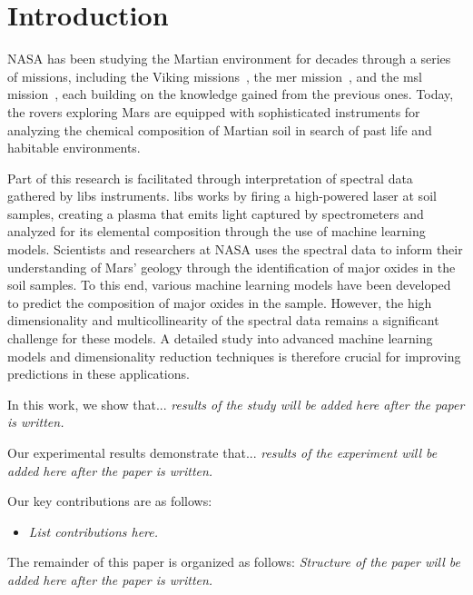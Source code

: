 \section{Introduction}\label{sec:introduction}

NASA has been studying the Martian environment for decades through a series of missions, including the Viking missions~\cite{marsnasagov_vikings}, the \gls{mer} mission~\cite{marsnasagov_observer, marsnasagov_spirit_opportunity}, and the \gls{msl} mission~\cite{marsnasagov_msl}, each building on the knowledge gained from the previous ones.
Today, the rovers exploring Mars are equipped with sophisticated instruments for analyzing the chemical composition of Martian soil in search of past life and habitable environments.

Part of this research is facilitated through interpretation of spectral data gathered  by \gls{libs} instruments.
\gls{libs} works by firing a high-powered laser at soil samples, creating a plasma that emits light captured by spectrometers and analyzed for its elemental composition through the use of machine learning models.
Scientists and researchers at NASA uses the spectral data to inform their understanding of Mars' geology through the identification of major oxides in the soil samples.
To this end, various machine learning models have been developed to predict the composition of major oxides in the sample.
However, the high dimensionality and multicollinearity of the spectral data remains a significant challenge for these models.
A detailed study into advanced machine learning models and dimensionality reduction techniques is therefore crucial for improving predictions in these applications.


In this work, we show that... \textit{results of the study will be added here after the paper is written.}

Our experimental results demonstrate that... \textit{results of the experiment will be added here after the paper is written.}

Our key contributions are as follows:
\begin{itemize}
	\item \textit{List contributions here.}
\end{itemize}


The remainder of this paper is organized as follows:
\textit{Structure of the paper will be added here after the paper is written.}
